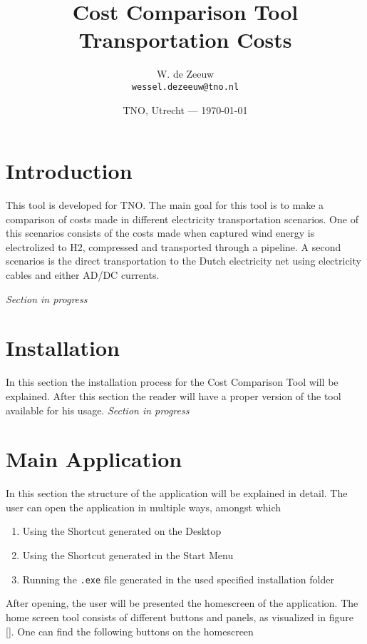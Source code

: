 \documentclass{article}
\title{Cost Comparison Tool Transportation Costs} %
\author{W. de Zeeuw\\ \texttt{wessel.dezeeuw@tno.nl}} %
\date{TNO, Utrecht --- \today} %
\begin{document}
\maketitle %


\section*{Introduction} %

	This tool is developed for TNO. The main goal for this tool is to make a
    comparison of costs made in different electricity transportation scenarios.
    One of this scenarios consists of the costs made when captured wind energy
    is electrolized to H2, compressed and transported through a pipeline. A
    second scenarios is the direct transportation to the Dutch electricity net
    using electricity cables and either AD/DC currents.

\bigskip
\textit{Section in progress} 

\section{Installation}
In this section the installation process for the Cost Comparison Tool will be explained. After this section the reader will have a proper version of the tool available for his usage. 
\bigskip
\textit{Section in progress} 

\section{Main Application} %

In this section the structure of the application will be explained in detail. The user can open the application in multiple ways, amongst which
\begin{enumerate}
	\item Using the Shortcut generated on the Desktop
	\item Using the Shortcut generated in the Start Menu
	\item Running the \texttt{.exe} file generated in the used specified installation folder
\end{enumerate}

After opening, the user will be presented the homescreen of the application. The home screen tool consists of different buttons and panels, as visualized in figure []. One can find the following buttons on the homescreen
\end{document}
